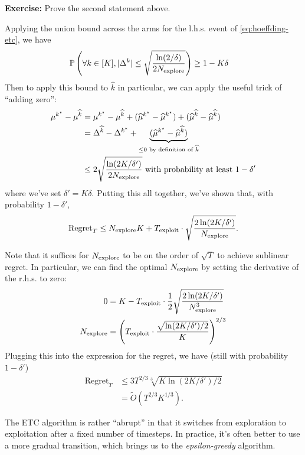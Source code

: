 \documentclass[\main/main]{subfiles}
\begin{document}
\textbf{Exercise:} Prove the second statement above.

Applying the union bound across the arms for the l.h.s. event of \ref*{eq:hoeffding-etc}, we have
\begin{align*}
    \operatorname*{\mathbb{P}}\left( \forall k \in [K], |\Delta^k | \le \sqrt{\frac{\ln(2/\delta)}{2N_{\text{explore}}}} \right) & \ge 1-K\delta
\end{align*}
Then to apply this bound to $\hat k$ in particular, we can apply the useful trick of ``adding zero'':
\begin{align*}
    \mu^{k^\star} - \mu^{\widehat k} & = \mu^{k^\star} - \mu^{\widehat k} + (\widehat \mu^{k^\star} - \widehat \mu^{k^\star}) + (\widehat \mu^{\widehat k} - \widehat \mu^{\widehat k})              \\
                                 & = \Delta^{\widehat k} - \Delta^{k^*} + \underbrace{(\widehat \mu^{k^\star} - \widehat \mu^{\widehat k})}_{\le 0 \text{ by definition of } \widehat k} \\
                                 & \le 2 \sqrt{\frac{\ln(2K/\delta')}{2N_{\text{explore}}}} \text{ with probability at least } 1-\delta'
\end{align*}
where we've set $\delta' = K\delta$.
Putting this all together, we've shown that, with probability $1 - \delta'$,
\[
    \text{Regret}_T \le N_{\text{explore}} K + T_{\text{exploit}} \cdot \sqrt{\frac{2\ln(2K/\delta')}{N_{\text{explore}}}}.
\]

Note that it suffices for $N_{\text{explore}}$ to be on the order of $\sqrt{T}$ to achieve sublinear regret. In particular, we can find the optimal $N_{\text{explore}}$ by setting the derivative of the r.h.s. to zero:
\begin{align*}
    0    & = K - T_{\text{exploit}} \cdot \frac{1}{2} \sqrt{\frac{2\ln(2K/\delta')}{N_{\text{explore}}^3}}  \\
    N_{\text{explore}} & = \left( T_{\text{exploit}} \cdot \frac{\sqrt{\ln(2K/\delta')/2}}{K} \right)^{2/3}
\end{align*}
Plugging this into the expression for the regret, we have (still with probability $1-\delta'$)
\begin{align*}
    \text{Regret}_T & \le 3 T^{2/3} \sqrt[3]{K \ln(2K/\delta') / 2} \\
                    & = \tilde{O}(T^{2/3} K^{1/3}).
\end{align*}

The ETC algorithm is rather ``abrupt'' in that it switches from exploration to exploitation after a fixed number of timesteps. In practice, it's often better to use a more gradual transition, which brings us to the \emph{epsilon-greedy} algorithm.
\end{document}
